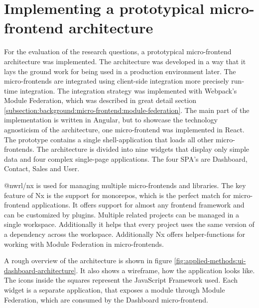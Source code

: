\section{Implementing a prototypical micro-frontend architecture}

For the evaluation of the research questions, a prototypical micro-frontend architecture was implemented. The architecture was developed in a way that it lays the ground work for being used in a production environment later. The micro-frontends are integrated using client-side integration more precisely run-time integration. The integration strategy was implemented with Webpack's Module Federation, which was described in great detail section \ref{subsection:background:micro-frontend:module-federation}. The main part of the implementation is written in Angular, but to showcase the technology agnosticism of the architecture, one micro-frontend was implemented in React. The prototype contains a single shell-application that loads all other micro-frontends. The architecture is divided into nine widgets that display only simple data and four complex single-page applications. The four SPA's are Dashboard, Contact, Sales and User.

\bigskip

\noindent @nwrl/nx is used for managing multiple micro-frontends and libraries. The key feature of Nx is the support for monorepos, which is the perfect match for micro-frontend applications. It offers support for almost any frontend framework and can be customized by plugins. Multiple related projects can be managed in a single workspace. Additionally it helps that every project uses the same version of a dependency across the workspace. Additionally Nx offers helper-functions for working with Module Federation in micro-frontends. \cite{misc::applied-methods:intro-to-nx}

\bigskip

\noindent A rough overview of the architecture is shown in figure \ref{fig:applied-methods:ui-dashboard-architecture}. It also shows a wireframe, how the application looks like. The icons inside the squares represent the JavaScript Framework used. Each widget is a separate application, that exposes a module through Module Federation, which are consumed by the Dashboard micro-frontend.

